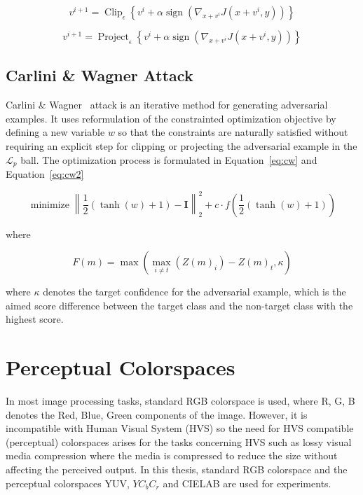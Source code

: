 \begin{equation}
    \label{eq:bim}
    v^{i+1}=\operatorname{Clip}_{\epsilon}\left\{v^{i}+\alpha \operatorname{sign}\left(\nabla_{x+v^{i}} J\left(x+v^{i}, y\right)\right)\right\}
\end{equation}

\begin{equation}
    \label{eq:pgd}
    v^{i+1}=\operatorname{Project}_{\epsilon}\left\{v^{i}+\alpha \operatorname{sign}\left(\nabla_{x+v^{i}} J\left(x+v^{i}, y\right)\right)\right\}
\end{equation}


\subsection{Carlini \& Wagner Attack}
Carlini \& Wagner~\cite{carlini2017towards} attack is an iterative method for generating adversarial examples. It uses reformulation of the constrainted optimization objective by defining a new variable \(w\) so that the constraints are naturally satisfied without requiring an explicit step for clipping or projecting the adversarial example in the \(\mathcal{L}_p\) ball. The optimization process is formulated in Equation~\ref{eq:cw} and Equation~\ref{eq:cw2}

\begin{equation}
    \label{eq:cw}
    \operatorname{minimize}\left\|\frac{1}{2}(\tanh (w)+1)-\boldsymbol{I}\right\|_{2}^{2}+c \cdot f\left(\frac{1}{2}(\tanh (w)+1)\right)
\end{equation}

where

\begin{equation}
    \label{eq:cw2}
    F(m)=\max \left(\max _{i \neq t}\left(Z(m)_{i}\right)-Z(m)_{t}, \kappa\right)
\end{equation}

where \(\kappa\) denotes the target confidence for the adversarial example, which is the aimed score difference between the target class and the non-target class with the highest score.



\section{Perceptual Colorspaces}
In most image processing tasks, standard RGB colorspace is used, where R, G, B denotes the Red, Blue, Green components of the image. However, it is incompatible with Human Visual System (HVS) so the need for HVS compatible (perceptual) colorspaces arises for the tasks concerning HVS such as lossy visual media compression where the media is compressed to reduce the size without affecting the perceived output. In this thesis, standard RGB colorspace and the perceptual colorspaces YUV, \(YC_{b}C_{r}\) and CIELAB are used for experiments.

